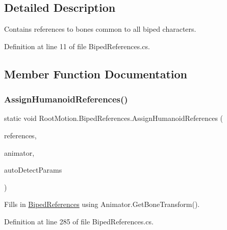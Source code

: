 \subsection{Detailed Description}
Contains references to bones common to all biped characters. 



Definition at line 11 of file Biped\+References.\+cs.



\subsection{Member Function Documentation}
\mbox{\label{class_root_motion_1_1_biped_references_a4d9655d6418610e47e87a16df00dfe4a}} 
\subsubsection{\texorpdfstring{Assign\+Humanoid\+References()}{AssignHumanoidReferences()}}
{\footnotesize\ttfamily static void Root\+Motion.\+Biped\+References.\+Assign\+Humanoid\+References (\begin{DoxyParamCaption}\item[{ref \mbox{\hyperlink{class_root_motion_1_1_biped_references}{Biped\+References}}}]{references,  }\item[{Animator}]{animator,  }\item[{\mbox{\hyperlink{struct_root_motion_1_1_biped_references_1_1_auto_detect_params}{Auto\+Detect\+Params}}}]{auto\+Detect\+Params }\end{DoxyParamCaption})\hspace{0.3cm}{\ttfamily [static]}}



Fills in \mbox{\hyperlink{class_root_motion_1_1_biped_references}{Biped\+References}} using Animator.\+Get\+Bone\+Transform(). 



Definition at line 285 of file Biped\+References.\+cs.

\mbox{\label{class_root_motion_1_1_biped_references_a9a0ace986622d184c741e801651d05dd}} 
